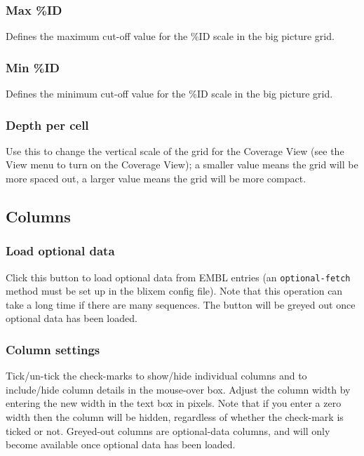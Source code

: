 \documentclass[letterpaper]{article}
\begin{document}
\bigskip

{\color[rgb]{0.30980393,0.5058824,0.7411765}\subsubsection[Max \%ID]{Max \%ID}}
\hypertarget{RefHeading2581056909880}{}
Defines the maximum cut-off value for the \%ID scale in the big picture grid.

\bigskip

{\color[rgb]{0.30980393,0.5058824,0.7411765}\subsubsection[Min \%ID]{Min \%ID}}
\hypertarget{RefHeading2601056909880}{}
Defines the minimum cut-off value for the \%ID scale in the big picture grid.

\bigskip

{\color[rgb]{0.30980393,0.5058824,0.7411765}\subsubsection[Depth per cell]{Depth per cell}}
\hypertarget{RefHeading334716266717}{}
Use this to change the vertical scale of the grid for the Coverage View (see the View menu to turn on the Coverage View); a smaller value means the grid will be more spaced out, a larger value means the grid will be more compact.

\bigskip

{\color[rgb]{0.30980393,0.5058824,0.7411765}\subsection[Columns]{Columns}}
\hypertarget{RefHeading2481056909880}{}
{\color[rgb]{0.30980393,0.5058824,0.7411765}\subsubsection[Load optional data]{Load optional data }}
\hypertarget{RefHeading2501056909880}{}
Click this button to load optional data from EMBL entries (an \texttt{optional-fetch} method must be set up in the blixem config file). Note that this operation can take a long time if there are many sequences. The button will be greyed out once optional data has been loaded.

\bigskip

{\color[rgb]{0.30980393,0.5058824,0.7411765}\subsubsection[Column settings]{Column settings}}
\hypertarget{RefHeading2521056909880}{}
Tick/un-tick the check-marks to show/hide individual columns and to include/hide column details in the mouse-over box. Adjust the column width by entering the new width in the text box in pixels. Note that if you enter a zero width then the column will be hidden, regardless of whether the check-mark is ticked or not. Greyed-out columns are optional-data columns, and will only become available once optional data has been loaded.
\end{document}
